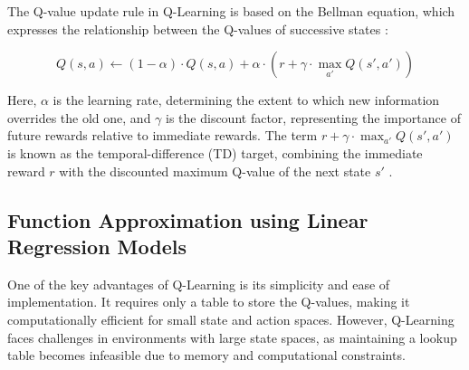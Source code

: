 The Q-value update rule in Q-Learning is based on the Bellman equation, which expresses the relationship between the Q-values of successive states \cite{russel2020ai}:

\[
Q(s, a) \leftarrow (1 - \alpha) \cdot Q(s, a) + \alpha \cdot \left( r + \gamma \cdot \max_{a'} Q(s', a') \right)
\]

Here, $\alpha$ is the learning rate, determining the extent to which new information overrides the old one, and $\gamma$ is the discount factor, representing the importance of future rewards relative to immediate rewards. The term $r + \gamma \cdot \max_{a'} Q(s', a')$ is known as the temporal-difference (TD) target, combining the immediate reward $r$ with the discounted maximum Q-value of the next state $s'$ \cite{russel2020ai}.




\subsection{Function Approximation using Linear Regression Models}

One of the key advantages of Q-Learning is its simplicity and ease of implementation. It requires only a table to store the Q-values, making it computationally efficient for small state and action spaces. However, Q-Learning faces challenges in environments with large state spaces, as maintaining a lookup table becomes infeasible due to memory and computational constraints.

